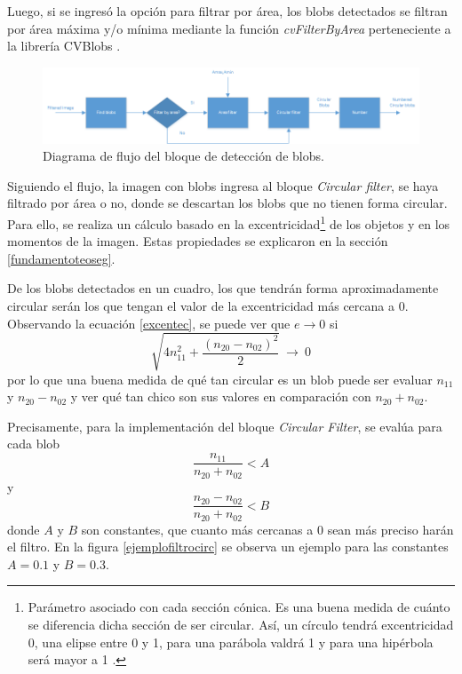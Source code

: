Luego, si se ingresó la opción para filtrar por área, los blobs \cite{defBlob} detectados se filtran por área máxima y/o mínima mediante la función \emph{cvFilterByArea} perteneciente a la librería CVBlobs \cite{cvblob}. 

\begin{figure}[H]
\hspace{-1.5cm}
\includegraphics[scale=0.7]{img/detectBlobs_diagrama.png}
\caption{Diagrama de flujo del bloque de detección de blobs.}
\label{diagramadetectblobs}
\end{figure}

Siguiendo el flujo, la imagen con blobs ingresa al bloque \emph{Circular filter}, se haya filtrado por área o no, donde se descartan los blobs que no tienen forma circular. Para ello, se realiza un cálculo basado en la excentricidad\footnote{Parámetro asociado con cada sección cónica. Es una buena medida de cuánto se diferencia dicha sección de ser circular. Así, un círculo tendrá excentricidad 0, una elipse entre 0 y 1, para una parábola valdrá 1 y para una hipérbola será mayor a 1 \cite{excentricidad}. } de los objetos y en los momentos de la imagen. Estas propiedades se explicaron en la sección \ref{fundamentoteoseg}.

De los blobs detectados en un cuadro, los que tendrán forma aproximadamente circular serán los que tengan el valor de la excentricidad más cercana a $0$. Observando la ecuación \ref{excentec}, se puede ver que $e{\rightarrow}0$ si $$\sqrt{4n_{11}^2+\frac{(n_{20}-n_{02})^2}{2}}\ {\rightarrow}\ 0$$ por lo que una buena medida de qué tan circular es un blob puede ser evaluar $n_{11}$ y $n_{20}-n_{02}$ y ver qué tan chico son sus valores en comparación con $n_{20}+n_{02}$.

Precisamente, para la implementación del bloque \emph{Circular Filter}, se evalúa para cada blob $$\frac{n_{11}}{n_{20}+n_{02}}< A$$ y $$\frac{n_{20}-n_{02}}{n_{20}+n_{02}}< B$$ donde $A$ y $B$ son constantes, que cuanto más cercanas a $0$ sean más preciso harán el filtro. En la figura \ref{ejemplofiltrocirc} se observa un ejemplo para las constantes $A = 0.1$ y $B = 0.3$.

